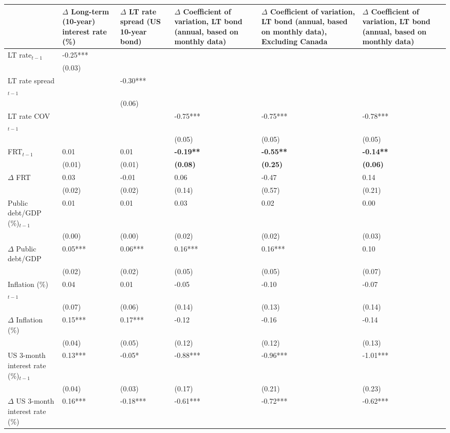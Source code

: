 {\tiny
\begin{tabular}{lp{2cm}p{2cm}p{2cm}p{2cm}p{2cm}}
  \hline
 & $\Delta$ Long-term (10-year) interest rate (\%) & $\Delta$ LT rate spread (US 10-year bond) & $\Delta$ Coefficient of variation, LT bond (annual, based on monthly data) & $\Delta$ Coefficient of variation, LT bond (annual, based on monthly data), \textbf{Excluding Canada} & $\Delta$ Coefficient of variation, LT bond (annual, based on monthly data) \\ 
  \hline
LT rate$_{t-1}$ & -0.25*** &  &  &  &  \\ 
   & (0.03) &  &  &  &  \\ 
  LT rate spread$_{t-1}$ &  & -0.30*** &  &  &  \\ 
   &  & (0.06) &  &  &  \\ 
  LT rate COV$_{t-1}$ &  &  & -0.75*** & -0.75*** & -0.78*** \\ 
   &  &  & (0.05) & (0.05) & (0.05) \\ 
  FRT$_{t-1}$ & 0.01 & 0.01 & \textbf{-0.19**} & \textbf{-0.55**} & \textbf{-0.14**} \\ 
   & (0.01) & (0.01) & \textbf{(0.08)} & \textbf{(0.25)} & \textbf{(0.06)} \\ 
  $\Delta$ FRT & 0.03 & -0.01 & 0.06 & -0.47 & 0.14 \\ 
   & (0.02) & (0.02) & (0.14) & (0.57) & (0.21) \\ 
  Public debt/GDP (\%)$_{t-1}$ & 0.01 & 0.01 & 0.03 & 0.02 & 0.00 \\ 
   & (0.00) & (0.00) & (0.02) & (0.02) & (0.03) \\ 
  $\Delta$ Public debt/GDP & 0.05*** & 0.06*** & 0.16*** & 0.16*** & 0.10 \\ 
   & (0.02) & (0.02) & (0.05) & (0.05) & (0.07) \\ 
  Inflation (\%) $_{t-1}$ & 0.04 & 0.01 & -0.05 & -0.10 & -0.07 \\ 
   & (0.07) & (0.06) & (0.14) & (0.13) & (0.14) \\ 
  $\Delta$ Inflation (\%) & 0.15*** & 0.17*** & -0.12 & -0.16 & -0.14 \\ 
   & (0.04) & (0.05) & (0.12) & (0.12) & (0.13) \\ 
  US 3-month interest rate (\%)$_{t-1}$ & 0.13*** & -0.05* & -0.88*** & -0.96*** & -1.01*** \\ 
   & (0.04) & (0.03) & (0.17) & (0.21) & (0.23) \\ 
  $\Delta$ US 3-month interest rate (\%) & 0.16*** & -0.18*** & -0.61*** & -0.72*** & -0.62*** \\ 

\end{tabular}}
